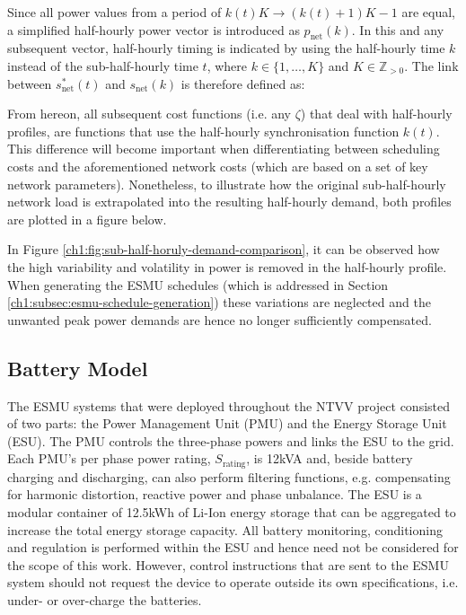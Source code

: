 

Since all power values from a period of $k(t)K \rightarrow (k(t)+1)K-1$ are equal, a simplified half-hourly power vector is introduced as $p_\text{net}(k)$. 
In this and any subsequent vector, half-hourly timing is indicated by using the half-hourly time $k$ instead of the sub-half-hourly time $t$, where $k \in \{1, \dots, K\}$ and $K \in \mathbb{Z}_{>0}$.
The link between $s^{*}_\text{net}(t)$ and $s_\text{net}(k)$ is therefore defined as:



From hereon, all subsequent cost functions (i.e. any $\zeta$) that deal with half-hourly profiles, are functions that use the half-hourly synchronisation function $k(t)$.
This difference will become important when differentiating between scheduling costs and the aforementioned network costs (which are based on a set of key network parameters).
Nonetheless, to illustrate how the original sub-half-hourly network load is extrapolated into the resulting half-hourly demand, both profiles are plotted in a figure below.



In Figure \ref{ch1:fig:sub-half-horuly-demand-comparison}, it can be observed how the high variability and volatility in power is removed in the half-hourly profile.
When generating the ESMU schedules (which is addressed in Section \ref{ch1:subsec:esmu-schedule-generation}) these variations are neglected and the unwanted peak power demands are hence no longer sufficiently compensated.

\subsection{Battery Model}


The ESMU systems that were deployed throughout the NTVV project consisted of two parts: the Power Management Unit (PMU) and the Energy Storage Unit (ESU).
The PMU controls the three-phase powers and links the ESU to the grid.
Each PMU's per phase power rating, $S_\text{rating}$, is 12kVA and, beside battery charging and discharging, can also perform filtering functions, e.g. compensating for harmonic distortion, reactive power and phase unbalance.
The ESU is a modular container of 12.5kWh of Li-Ion energy storage that can be aggregated to increase the total energy storage capacity.
All battery monitoring, conditioning and regulation is performed within the ESU and hence need not be considered for the scope of this work.
However, control instructions that are sent to the ESMU system should not request the device to operate outside its own specifications, i.e. under- or over-charge the batteries.

